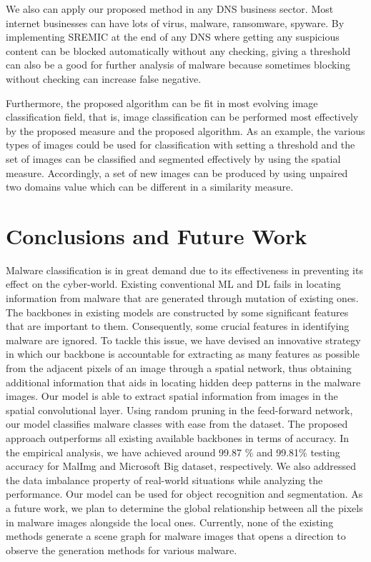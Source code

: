\documentclass[pdflatex,sn-mathphys]{sn-jnl}%
\begin{document}
We also can apply our proposed method in any DNS business sector. Most internet businesses can have lots of virus, malware, ransomware, spyware. By implementing SREMIC at the end of any DNS where getting any suspicious content can be blocked automatically without any checking, giving a threshold can also be a good for further analysis of malware because sometimes blocking without checking can increase false negative.

Furthermore, the proposed algorithm can be fit in most evolving image classification field, that is, image classification can be performed most effectively by the proposed measure and the proposed algorithm. As an example, the various types of images could be used for classification with setting a threshold and the set of images can be classified and segmented effectively by using the spatial measure. Accordingly, a set of new images can be produced by using unpaired two domains value which can be different in a similarity measure.
\color{black}

\section{Conclusions and Future Work}
\label{conclusion}
Malware classification is in great demand due to its effectiveness in preventing its effect on the cyber-world. Existing conventional ML and DL fails in locating information from malware that are generated through mutation of existing ones. The backbones in existing models are constructed by some significant features that are important to them. Consequently, some crucial features in identifying malware are ignored. To tackle this issue, we have devised an innovative strategy in which our backbone is accountable for extracting as many features as possible from the adjacent pixels of an image through a spatial network, thus obtaining additional information that aids in locating hidden deep patterns in the malware images. Our model is able to extract spatial information from images in the spatial convolutional layer. Using random pruning in the feed-forward network,  our model classifies malware classes with ease from the dataset. The proposed approach outperforms all existing available backbones in terms of accuracy. In the empirical analysis, we have achieved around 99.87 \% and 99.81\% testing accuracy for MalImg and Microsoft Big dataset, respectively. We also addressed the data imbalance property of real-world situations while analyzing the performance. Our model can be used for object recognition and segmentation. As a future work, we plan to determine the global relationship between all the pixels in malware images alongside the local ones. Currently, none of the existing methods generate a scene graph for malware images that opens a direction to observe the generation methods for various malware.
\end{document}

